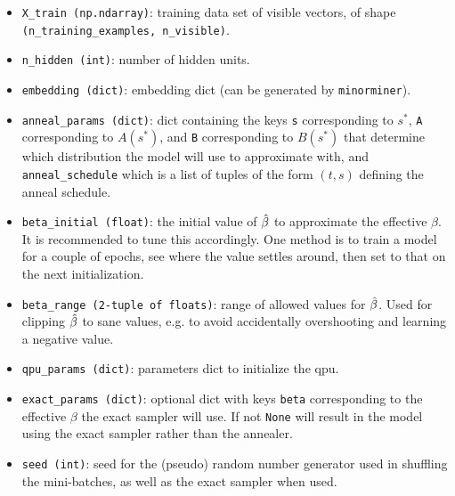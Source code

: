 \begin{itemize}
    \item \texttt{X\_train (np.ndarray)}: training data set of visible vectors, of shape \newline\texttt{(n\_training\_examples, n\_visible)}.
    \item \texttt{n\_hidden (int)}: number of hidden units.
    \item \texttt{embedding (dict)}: embedding dict (can be generated by \texttt{minorminer}).
    \item \texttt{anneal\_params (dict)}: dict containing the keys \texttt{s} corresponding to \( s^* \), \texttt{A} corresponding to \( A(s^*) \), and \texttt{B} corresponding to \( B(s^*) \) that determine which distribution the model will use to approximate with, and \texttt{anneal\_schedule} which is a list of tuples of the form \( (t, s) \) defining the anneal schedule.
    \item \texttt{beta\_initial (float)}: the initial value of \( \hat{\beta} \) to approximate the effective \( \beta \). It is recommended to tune this accordingly. One method is to train a model for a couple of epochs, see where the value settles around, then set to that on the next initialization.
    \item \texttt{beta\_range (2-tuple of floats)}: range of allowed values for \( \hat{\beta} \). Used for clipping \( \hat{\beta} \) to sane values, e.g. to avoid accidentally overshooting and learning a negative value.
    \item \texttt{qpu\_params (dict)}: parameters dict to initialize the qpu.
    \item \texttt{exact\_params (dict)}: optional dict with keys \texttt{beta} corresponding to the effective \( \beta \) the exact sampler will use. If not \texttt{None} will result in the model using the exact sampler rather than the annealer.
    \item \texttt{seed (int)}: seed for the (pseudo) random number generator used in shuffling the mini-batches, as well as the exact sampler when used.
\end{itemize}

